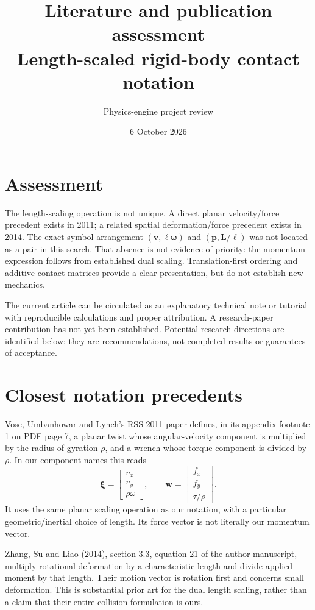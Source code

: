 \documentclass[11pt,a4paper]{article}
\title{Literature and publication assessment\\Length-scaled rigid-body contact notation}
\author{Physics-engine project review}
\date{6 October 2026}
\begin{document}
\maketitle

\section{Assessment}
The length-scaling operation is not unique. A direct planar velocity/force precedent exists in 2011; a related spatial deformation/force precedent exists in 2014. The exact symbol arrangement $(\mathbf v,\ell\boldsymbol\omega)$ and $(\mathbf p,\mathbf L/\ell)$ was not located as a pair in this search. That absence is not evidence of priority: the momentum expression follows from established dual scaling. Translation-first ordering and additive contact matrices provide a clear presentation, but do not establish new mechanics.

The current article can be circulated as an explanatory technical note or tutorial with reproducible calculations and proper attribution. A research-paper contribution has not yet been established. Potential research directions are identified below; they are recommendations, not completed results or guarantees of acceptance.

\section{Closest notation precedents}
Vose, Umbanhowar and Lynch's RSS 2011 paper defines, in its appendix footnote 1 on PDF page 7, a planar twist whose angular-velocity component is multiplied by the radius of gyration $\rho$, and a wrench whose torque component is divided by $\rho$\cite{vose}. In our component names this reads
\begin{equation}
\boldsymbol\xi=\begin{bmatrix}v_x\\v_y\\\rho\omega\end{bmatrix},\qquad
\mathbf w=\begin{bmatrix}f_x\\f_y\\\tau/\rho\end{bmatrix}.
\end{equation}
It uses the same planar scaling operation as our notation, with a particular geometric/inertial choice of length. Its force vector is not literally our momentum vector.

Zhang, Su and Liao (2014), section 3.3, equation 21 of the author manuscript, multiply rotational deformation by a characteristic length and divide applied moment by that length\cite{zhang}. Their motion vector is rotation first and concerns small deformation. This is substantial prior art for the dual length scaling, rather than a claim that their entire collision formulation is ours.
\end{document}
